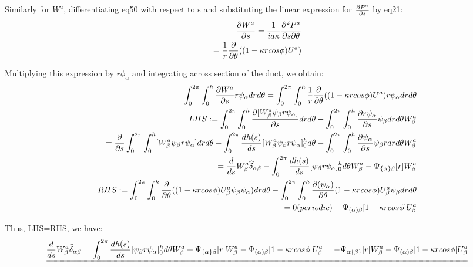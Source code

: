 \documentclass{Note}
\begin{document}
Similarly for $W^a$, differentiating eq50 with respect to s and substituting the linear expression for $\partial P^a\over \partial s$ by eq21:
\begin{equation}
\begin{aligned}
{\partial W^a \over \partial s}={1\over {ia\kappa }}{\partial^2 P^a \over \partial s\partial \theta}\\
={1\over r}{\partial \over \partial \theta}((1-\kappa r cos\phi)U^a)
\end{aligned}
\end{equation}


Multiplying this expression by $r\phi_\alpha$ and integrating across section of the duct, we obtain:
\begin{equation}
\begin{aligned}
\int_0^{2\pi}\int_0^h {\partial W^a \over \partial s} r \psi_\alpha dr d\theta=
\int_0^{2\pi}\int_0^h {1\over r}{\partial \over \partial \theta}((1-\kappa r cos\phi)U^a) r \psi_\alpha dr d\theta\\
LHS:
=\int_0^{2\pi}\int_0^h {\partial [W_\beta^a \psi_\beta r  \psi_\alpha] \over \partial s}  dr d\theta-\int_0^{2\pi}\int_0^h {\partial r  \psi_\alpha  \over \partial s}   \psi_\beta dr d\theta W_\beta^a\\
={\partial \over \partial s}\int_0^{2\pi}\int_0^h [W_\beta^a \psi_\beta r  \psi_\alpha ]  dr d\theta
-\int_0^{2\pi}{dh(s)\over ds} [W_\beta^a \psi_\beta r  \psi_\alpha ]_0^h d\theta
-\int_0^{2\pi}\int_0^h {\partial  \psi_\alpha  \over \partial s}   \psi_\beta r  dr d\theta W_\beta^a\\
={d \over d s} W_\beta^a \widehat{\delta }_{\alpha\beta}-\int_0^{2\pi}{dh(s)\over ds} [ \psi_\beta r  \psi_\alpha ]_0^h d\theta W_\beta^a-\Psi_{\{\alpha\}\beta}[r]W_\beta^a\\
RHS:=\int_0^{2\pi}\int_0^h {\partial \over \partial \theta}((1-\kappa r cos\phi)U_\beta^a \psi_\beta  \psi_\alpha) dr d\theta-\int_0^{2\pi}\int_0^h {\partial ( \psi_\alpha)\over \partial \theta}(1-\kappa r cos\phi)U_\beta^a  \psi_\beta  dr d\theta\\
=0(periodic)-\Psi_{(\alpha)\beta}[1-\kappa r cos\phi]U_\beta^a 
\end{aligned}
\end{equation}
 
Thus, LHS=RHS, we have:
\begin{equation}
\begin{aligned}
\uuline{{d \over ds} W_\beta^a \widehat{\delta }_{\alpha\beta}=\int_0^{2\pi}{dh(s)\over ds} [ \psi_\beta r  \psi_\alpha ]_0^h d\theta W_\beta^a+\Psi_{\{\alpha\}\beta}[r]W_\beta^a
-\Psi_{(\alpha)\beta}[1-\kappa r cos\phi]U_\beta^a =
-\Psi_{\alpha\{\beta\}}[r]W_\beta^a-\Psi_{(\alpha)\beta}[1-\kappa r cos\phi]U_\beta^a }
\end{aligned}
\end{equation}
\end{document}
